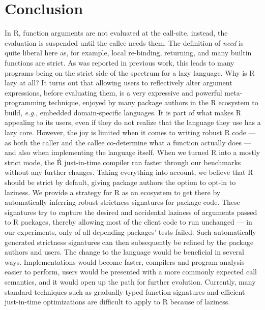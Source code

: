 \documentclass[screen,acmsmall]{acmart}
\renewcommand{\Rsh}{{\sf\v R}\xspace}
\newcommand{\eg}{\emph{e.g.},\xspace}
\begin{document}
\section{Conclusion}\label{sec:conclusion}

In R, function arguments are not evaluated at the call-site, instead, the
evaluation is suspended until the callee needs them. The definition of
\emph{need} is quite liberal here as, for example, local re-binding, returning,
and many builtin functions are strict. As was reported in previous work, this
leads to many programs being on the strict side of the spectrum for a lazy
language. Why is R lazy at all? It turns out that allowing users to reflectively
alter argument expressions, before evaluating them, is a very expressive and
powerful meta-programming technique, enjoyed by many package authors in the R
ecosystem to build, \eg embedded domain-specific languages. It is part of what
makes R appealing to its users, even if they do not realize that the language
they use has a lazy core. However, the joy is limited when it comes to writing
robust R code --- as both the caller and the callee co-determine what a function
actually does --- and also when implementing the language itself. When we turned
R into a mostly strict mode, the \Rsh just-in-time compiler ran
\speedupRshStrict faster through our benchmarks without any further changes.
Taking everything into account, we believe that R should be strict by default,
giving package authors the option to opt-in to laziness. We provide a strategy
for R as an ecosystem to get there by automatically inferring robust strictness
signatures for package code. These signatures try to capture the desired and
accidental laziness of arguments passed to R packages, thereby allowing most of
the client code to run unchanged --- in our experiments, only
\ValidationStrictFailedProgramPerc of all depending packages' tests failed. Such
automatically generated strictness signatures can then subsequently be refined
by the package authors and users. The change to the language would be beneficial
in several ways. Implementations would become faster, compilers and program
analysis easier to perform, users would be presented with a more commonly
expected call semantics, and it would open up the path for further evolution.
Currently, many standard techniques such as gradually typed function signatures
and efficient just-in-time optimizations are difficult to apply to R because of
laziness.


\end{document}
